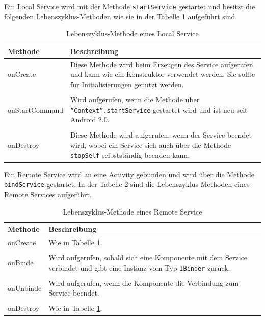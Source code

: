 Ein Local Service wird mit der Methode \texttt{startService} gestartet und besitzt die folgenden Lebenszyklus-Methoden wie sie in der Tabelle \ref{Lebenszyklus-Methode eines Local Service} aufgef\"uhrt sind.

\begin{table}[!ht]
\begin{tabular}{|p{3cm}|p{12cm}|}
 \hline Methode & Beschreibung \\
 \hline onCreate & Diese Methode wird beim Erzeugen des Service aufgerufen und kann wie ein Konstruktor verwendet werden. Sie sollte f\"ur Initialisierungen genutzt werden.\\&\\
 onStartCommand & Wird aufgerufen, wenn die Methode \"uber \texttt{"`Context"'.startService} gestartet wird und ist neu seit Android 2.0.\\&\\
 onDestroy & Diese Methode wird aufgerufen, wenn der Service beendet wird, wobei ein Service sich auch \"uber die Methode \texttt{stopSelf} selbstst\"andig beenden kann.\\
 \hline
\end{tabular}
\caption{Lebenszyklus-Methode eines Local Service \cite{Android44}}
\label{Lebenszyklus-Methode eines Local Service}
\end{table}
\FloatBarrier

Ein Remote Service wird an eine Activity gebunden und wird \"uber die Methode \texttt{bindService} gestartet. In der Tabelle \ref{Lebenszyklus-Methode eines Remote Service} sind die Lebenszyklus-Methoden eines Remote Services aufgef\"uhrt.

\FloatBarrier
\begin{table}[!ht]
\begin{tabular}{|p{3cm}|p{12cm}|}
 \hline Methode & Beschreibung \\
 \hline onCreate & Wie in Tabelle \ref{Lebenszyklus-Methode eines Local Service}.\\&\\
 onBinde & Wird aufgerufen, sobald sich eine Komponente mit dem Service verbindet und gibt eine Instanz vom Typ \texttt{IBinder} zur\"uck.\\&\\
 onUnbinde & Wird aufgerufen, wenn die Komponente die Verbindung zum Service beendet.\\&\\
 onDestroy & Wie in Tabelle \ref{Lebenszyklus-Methode eines Local Service}.\\
 \hline
\end{tabular}
\caption{Lebenszyklus-Methode eines Remote Service \cite{Android44}}
\label{Lebenszyklus-Methode eines Remote Service}
\end{table}
\FloatBarrier

